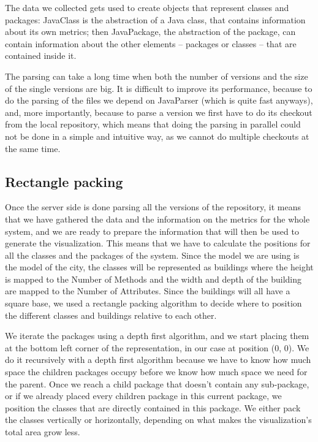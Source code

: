 \documentclass[]{usiinfbachelorproject}
\begin{document}
The data we collected gets used to create objects that represent classes and packages: JavaClass is the abstraction of a Java class, that contains information about its own metrics; then JavaPackage, the abstraction of the package, can contain information about the other elements -- packages or classes -- that are contained inside it.

The parsing can take a long time when both the number of versions and the size of the single versions are big.
It is difficult to improve its performance, because to do the parsing of the files we depend on JavaParser (which is quite fast anyways), and, more importantly, because to parse a version we first have to do its checkout from the local repository, which means that doing the parsing in parallel could not be done in a simple and intuitive way, as we cannot do multiple checkouts at the same time.

\subsection{Rectangle packing} \label{Rectangle packing}
Once the server side is done parsing all the versions of the repository, it means that we have gathered the data and the information on the metrics for the whole system, and we are ready to prepare the information that will then be used to generate the visualization. This means that we have to calculate the positions for all the classes and the packages of the system. Since the model we are using is the model of the city, the classes will be represented as buildings where the height is mapped to the Number of Methods and the width and depth of the building are mapped to the Number of Attributes. Since the buildings will all have a square base, we used a rectangle packing algorithm to decide where to position the different classes and buildings relative to each other.

We iterate the packages using a depth first algorithm, and we start placing them at the bottom left corner of the representation, in our case at position (0, 0). We do it recursively with a depth first algorithm because we have to know how much space the children packages occupy before we know how much space we need for the parent.
Once we reach a child package that doesn't contain any sub-package, or if we already placed every children package in this current package, we position the classes that are directly contained in this package. We either pack the classes vertically or horizontally, depending on what makes the visualization's total area grow less.
\end{document}
